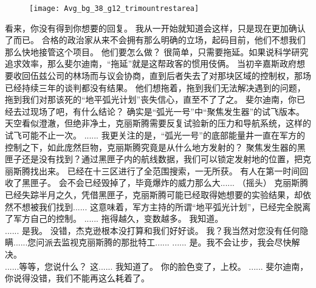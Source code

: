\documentclass[openany]{book}
\begin{document}
\begin{figure}[h]
    \centering
    \texttt{[image: Avg\_bg\_38\_g12\_trimountrestarea]}
\end{figure}
\begin{dialogue}
     看来，你没有得到你想要的回复。
     我从一开始就知道会这样，只是现在更加确认了而已。
     合格的政治家从来不会拥有那么明确的立场，起码目前，他们不想我们那么快地接管这个项目。
     他们要怎么做？
     很简单，只需要拖延。如果说科学研究追求效率，那么斐尔迪南，“拖延”就是这帮政客的惯用伎俩。
     当初辛嘉斯政府想要收回伍兹公司的林场而与议会协商，直到后者失去了对那块区域的控制权，那场已经持续三年的谈判都没有结果。
     他们想拖着，拖到我们无法解决遇到的问题，拖到我们对那该死的“地平弧光计划”丧失信心，直至不了了之。
     斐尔迪南，你已经去过现场了吧，有什么结论？
     确实是“弧光一号”中“聚焦发生器”的试飞版本。
     天空看似澄澈，但绝非净土，克丽斯腾需要反复试验新的压力和导航系统，这样的试飞可能不止一次。
     ......
     我更关注的是，“弧光一号”的底部能量井一直在军方的控制之下，如此庞然巨物，克丽斯腾究竟是从什么地方发射的？
     聚焦发生器的黑匣子还是没有找到？通过黑匣子内的航线数据，我们可以锁定发射地的位置，把克丽斯腾找出来。
     已经在十三区进行了全范围搜索，一无所获。
     有人在第一时间回收了黑匣子。
     会不会已经毁掉了，毕竟爆炸的威力那么大......
     （摇头）
     克丽斯腾已经失踪半月之久，凭借黑匣子，克丽斯腾可能已经取得她想要的实验结果，却依然不想被我们找到......
     这意味着，军方主持的所谓“地平弧光计划”，已经完全脱离了军方自己的控制。
     ......
     拖得越久，变数越多。
     我知道。
    \\
     ......
     是我。
     没错，杰克逊根本没打算和我们好好谈。
     我？我当然对您没有任何隐瞒......您问派去监视克丽斯腾的那批特工......
     ......
     是。我不会让步，我会尽快解决。
    \\
     ......等等，您说什么？
     这......
     我知道了。
     你的脸色变了，上校。
     ......
     斐尔迪南，你说得没错，我们不能再这么耗着了。
\end{dialogue}
\end{document}
